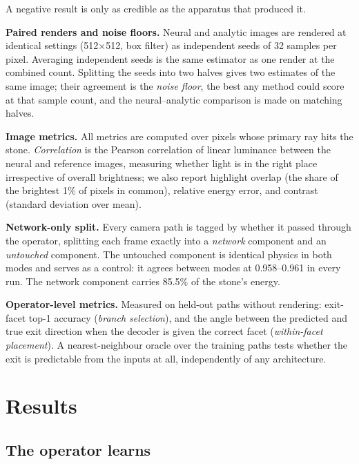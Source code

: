 \documentclass[conference]{IEEEtran}
\begin{document}
A negative result is only as credible as the apparatus that produced it.

\textbf{Paired renders and noise floors.} Neural and analytic images are rendered
at identical settings (512$\times$512, box filter) as independent seeds of 32
samples per pixel. Averaging independent seeds is the same estimator as one
render at the combined count. Splitting the seeds into two halves gives two
estimates of the same image; their agreement is the \emph{noise floor}, the best
any method could score at that sample count, and the neural--analytic comparison
is made on matching halves.

\textbf{Image metrics.} All metrics are computed over pixels whose primary ray
hits the stone. \emph{Correlation} is the Pearson correlation of linear
luminance between the neural and reference images, measuring whether light is in
the right place irrespective of overall brightness; we also report highlight
overlap (the share of the brightest 1\% of pixels in common), relative energy
error, and contrast (standard deviation over mean).

\textbf{Network-only split.} Every camera path is tagged by whether it passed
through the operator, splitting each frame exactly into a \emph{network}
component and an \emph{untouched} component. The untouched component is
identical physics in both modes and serves as a control: it agrees between modes
at 0.958--0.961 in every run. The network component carries 85.5\% of the
stone's energy.

\textbf{Operator-level metrics.} Measured on held-out paths without rendering:
exit-facet top-1 accuracy (\emph{branch selection}), and the angle between the
predicted and true exit direction when the decoder is given the correct facet
(\emph{within-facet placement}). A nearest-neighbour oracle over the training
paths tests whether the exit is predictable from the inputs at all,
independently of any architecture.

\section{Results}
\label{sec:results}

\subsection{The operator learns}
\end{document}
